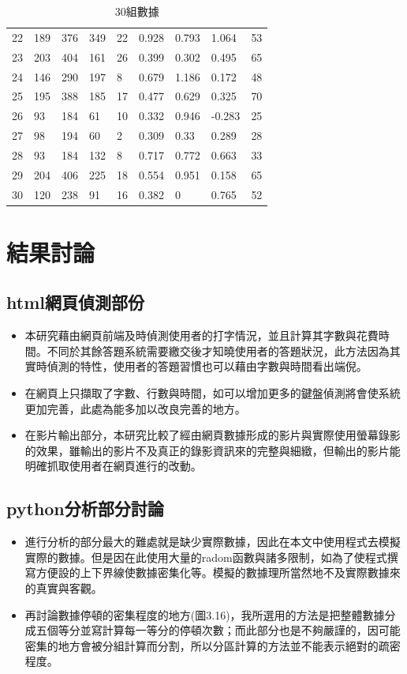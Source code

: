 \begin{table}[]
\begin{tabular}{lllllllll}
		22 & 189 & 376 & 349    & 22     & 0.928  & 0.793  & 1.064  & 53      \\
		23 & 203 & 404 & 161    & 26     & 0.399  & 0.302  & 0.495  & 65      \\
		24 & 146 & 290 & 197    & 8      & 0.679  & 1.186  & 0.172  & 48      \\
		25 & 195 & 388 & 185    & 17     & 0.477  & 0.629  & 0.325  & 70      \\
		26 & 93  & 184 & 61     & 10     & 0.332  & 0.946  & -0.283 & 25      \\
		27 & 98  & 194 & 60     & 2      & 0.309  & 0.33   & 0.289  & 28      \\
		28 & 93  & 184 & 132    & 8      & 0.717  & 0.772  & 0.663  & 33      \\
		29 & 204 & 406 & 225    & 18     & 0.554  & 0.951  & 0.158  & 65      \\
		30 & 120 & 238 & 91     & 16     & 0.382  & 0      & 0.765  & 52     
	\end{tabular}
\caption{30組數據}
\end{table}
\newpage
\section{結果討論}
\subsection{html網頁偵測部份}
\begin{itemize}
	\item 本研究藉由網頁前端及時偵測使用者的打字情況，並且計算其字數與花費時間。不同於其餘答題系統需要繳交後才知曉使用者的答題狀況，此方法因為其實時偵測的特性，使用者的答題習慣也可以藉由字數與時間看出端倪。
	\item 在網頁上只擷取了字數、行數與時間，如可以增加更多的鍵盤偵測將會使系統更加完善，此處為能多加以改良完善的地方。
	\item 在影片輸出部分，本研究比較了經由網頁數據形成的影片與實際使用螢幕錄影的效果，雖輸出的影片不及真正的錄影資訊來的完整與細緻，但輸出的影片能明確抓取使用者在網頁進行的改動。
\end{itemize}
\subsection{python分析部分討論}
\begin{itemize}
	\item 進行分析的部分最大的難處就是缺少實際數據，因此在本文中使用程式去模擬實際的數據。但是因在此使用大量的radom函數與諸多限制，如為了使程式撰寫方便設的上下界線使數據密集化等。模擬的數據理所當然地不及實際數據來的真實與客觀。
	\item 再討論數據停頓的密集程度的地方(圖3.16)，我所選用的方法是把整體數據分成五個等分並寫計算每一等分的停頓次數；而此部分也是不夠嚴謹的，因可能密集的地方會被分組計算而分割，所以分區計算的方法並不能表示絕對的疏密程度。
\end{itemize}